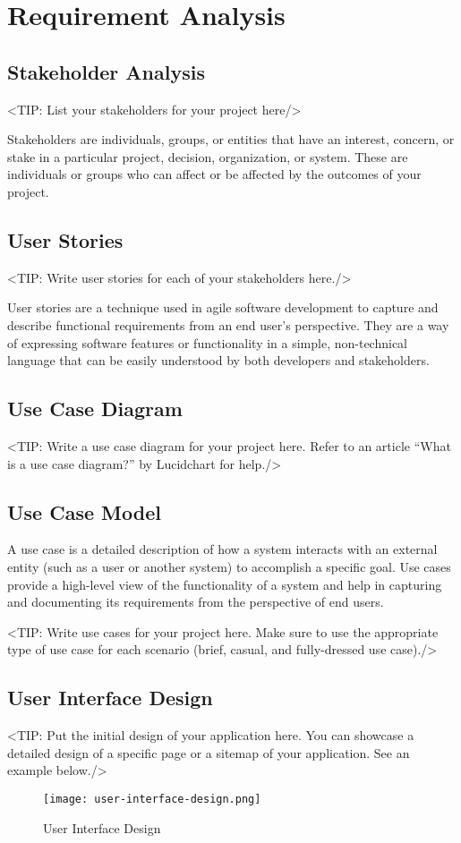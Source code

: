 \chapter{Requirement Analysis}
\label{chap:requirement-analysis}

\section{Stakeholder Analysis}
\label{section:stakeholder-analysis}
<TIP: List your stakeholders for your project here/>

Stakeholders are individuals, groups, or entities that
have an interest, concern, or stake in a particular project, decision,
organization, or system. These are individuals or groups who can affect or be
affected by the outcomes of your project.

\section{User Stories}
\label{section:user-stories}
<TIP: Write user stories for each of your stakeholders here./>

User stories are a technique used in agile software
development to capture and describe functional requirements from an end
user's perspective. They are a way of expressing software features or
functionality in a simple, non-technical language that can be easily understood
by both developers and stakeholders.

\section{Use Case Diagram}
\label{section:use-case-diagram}
<TIP: Write a use case diagram for your project here. Refer to an
article “What is a use case diagram?” by Lucidchart for help./>

\section{Use Case Model}
\label{section:use-case-model}
A use case is a detailed description of how a system
interacts with an external entity (such as a user or another system) to
accomplish a specific goal. Use cases provide a high-level view of the
functionality of a system and help in capturing and documenting its
requirements from the perspective of end users.

<TIP: Write use cases for your project here. Make sure to use the
appropriate type of use case for each scenario (brief, casual, and fully-dressed
use case)./>

\section{User Interface Design}
\label{section:user-interface-design}
<TIP: Put the initial design of your application here. You can
showcase a detailed design of a specific page or a sitemap of your application.
See an example below./>

\begin{figure}[h]
    \centering
    \texttt{[image: user-interface-design.png]}
    \caption{User Interface Design}
\end{figure}